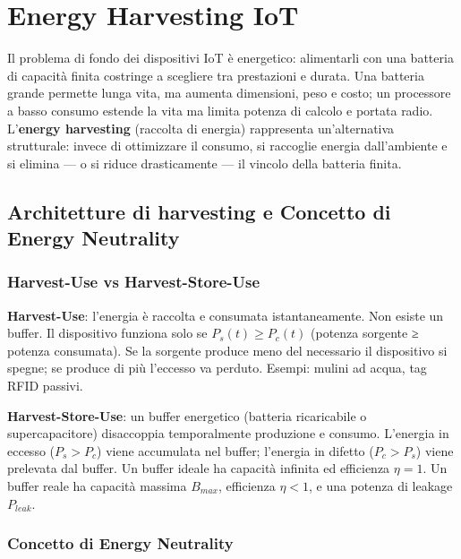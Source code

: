 \documentclass[
  italian,
  openany]{book}
\begin{document}
\newpage

\chapter{Energy Harvesting IoT}\label{energy-harvesting-iot}

Il problema di fondo dei dispositivi IoT è energetico: alimentarli con
una batteria di capacità finita costringe a scegliere tra prestazioni e
durata. Una batteria grande permette lunga vita, ma aumenta dimensioni,
peso e costo; un processore a basso consumo estende la vita ma limita
potenza di calcolo e portata radio. L'\textbf{energy harvesting}
(raccolta di energia) rappresenta un'alternativa strutturale: invece di
ottimizzare il consumo, si raccoglie energia dall'ambiente e si elimina
--- o si riduce drasticamente --- il vincolo della batteria finita.

\section{Architetture di harvesting e Concetto di Energy
Neutrality}\label{architetture-di-harvesting-e-concetto-di-energy-neutrality}

\subsection{Harvest-Use vs
Harvest-Store-Use}\label{harvest-use-vs-harvest-store-use}

\textbf{Harvest-Use}: l'energia è raccolta e consumata istantaneamente.
Non esiste un buffer. Il dispositivo funziona solo se
\(P_s(t) \geq P_c(t)\) (potenza sorgente ≥ potenza consumata). Se la
sorgente produce meno del necessario il dispositivo si spegne; se
produce di più l'eccesso va perduto. Esempi: mulini ad acqua, tag RFID
passivi.

\textbf{Harvest-Store-Use}: un buffer energetico (batteria ricaricabile
o supercapacitore) disaccoppia temporalmente produzione e consumo.
L'energia in eccesso (\(P_s > P_c\)) viene accumulata nel buffer;
l'energia in difetto (\(P_c > P_s\)) viene prelevata dal buffer. Un
buffer ideale ha capacità infinita ed efficienza \(\eta = 1\). Un buffer
reale ha capacità massima \(B_{max}\), efficienza \(\eta < 1\), e una
potenza di leakage \(P_{leak}\).

\subsection{Concetto di Energy
Neutrality}\label{concetto-di-energy-neutrality}
\end{document}
